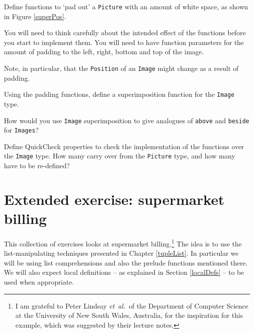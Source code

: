 \begin{exercises}


\item
Define functions to `pad out' a \texttt{Picture}
with an amount of white space, as shown in Figure \ref{superPos}.

You will need to think carefully about
the intended effect of the functions before you start to
implement them. You will need to have function parameters for the amount of padding
to the left, right, bottom and top of the image.

Note, in particular, that the \texttt{Position} of an
\texttt{Image} might change as a result of padding.

\item
Using the padding functions, define a superimposition function for
the \texttt{Image} type.

\item
How would you use \texttt{Image} superimposition to give analogues of 
\texttt{above} and \texttt{beside} for \texttt{Images}?

\item 
Define QuickCheck properties to check the implementation of the functions over the \texttt{Image} type. How many carry over from the \texttt{Picture} type, and how many have to be re-defined?


\end{exercises}


\section{Extended exercise: supermarket billing}
\label{superBill}

This collection of exercises looks at supermarket billing.\footnote{I am
grateful to Peter Lindsay {\em et\ al.\ }of the Department of
Computer Science at the University of New South Wales, Australia, for the
inspiration for this example, which was suggested by their lecture
notes.} The idea is to use the
list-manipulating techniques presented in Chapter \ref{tupleList}. In particular
we will be using list comprehensions and also the prelude functions
mentioned there. We will also expect local definitions -- as explained
in Section \ref{localDefs} -- to be used when
appropriate.

